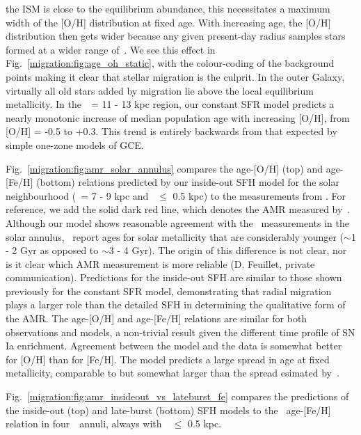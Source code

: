 the ISM is close to the equilibrium abundance, this necessitates a maximum 
width of the [O/H] distribution at fixed age. 
With increasing age, the [O/H] distribution then gets wider because any given 
present-day radius samples stars formed at a wider range of~\rgal. 
We see this effect in Fig.~\ref{migration:fig:age_oh_static}, with the colour-coding of 
the background points making it clear that stellar migration 
is the culprit. 
In the outer Galaxy, virtually all old stars added by migration lie above the 
local equilibrium metallicity. 
In the~\rgal~= 11 - 13 kpc region, our constant SFR model predicts a nearly 
monotonic increase of median population age with increasing [O/H], from 
[O/H] = -0.5 to +0.3. 
This trend is entirely backwards from that expected by simple one-zone models 
of GCE. 
\par 
Fig.~\ref{migration:fig:amr_solar_annulus} compares the age-[O/H] (top) and 
age-[Fe/H] (bottom) relations predicted by our inside-out SFH model for the 
solar neighbourhood (\rgal~= 7 - 9 kpc and \absz~$\leq$ 0.5 kpc) to the 
measurements from \citet{Feuillet2019}. 
For reference, we add the solid dark red line, which denotes the AMR measured 
by~\citet{Feuillet2018}. 
Although our model shows reasonable agreement with the~\citet{Feuillet2019} 
measurements in the solar annulus,~\citet{Feuillet2018} report ages for solar 
metallicity that are considerably younger ($\sim$1 - 2 Gyr as opposed to 
$\sim$3 - 4 Gyr). 
The origin of this difference is not clear, nor is it clear which AMR 
measurement is more reliable (D. Feuillet, private communication). 
Predictions for the inside-out SFH are similar to those shown previously 
for the constant SFR model, demonstrating that radial migration plays a larger 
role than the detailed SFH in determining the qualitative form of the AMR. 
The age-[O/H] and age-[Fe/H] relations are similar for both observations and 
models, a non-trivial result given the different time profile of SN Ia 
enrichment. 
Agreement between the model and the data is somewhat better for [O/H] than for 
[Fe/H]. 
The model predicts a large spread in age at fixed metallicity, comparable to 
but somewhat larger than the spread esimated by~\citet{Feuillet2019}. 
\par
Fig.~\ref{migration:fig:amr_insideout_vs_lateburst_fe} compares the predictions of the 
inside-out (top) and late-burst (bottom) SFH models to the~\citet{Feuillet2019} 
age-[Fe/H] relation in four~\rgal~annuli, always with~\absz~$\leq$ 0.5 kpc. 
